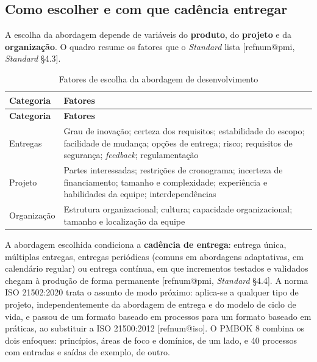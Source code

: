 \documentclass[11pt,a4paper]{article}
\makeatletter
\newcommand{\refnum}[1]{\csname refnum@#1\endcsname}
\newcommand{\cit}[1]{[\refnum{#1}]}
\newcommand{\SingleSpacing}{}
\newcommand{\fontetab}[1]{\par\vspace{3pt}{\small\noindent Fonte: #1\par}}
\makeatother
\begin{document}
\subsection{Como escolher e com que cadência entregar}

A escolha da abordagem depende de variáveis do \textbf{produto}, do \textbf{projeto} e da \textbf{organização}. O quadro resume os fatores que o \textit{Standard} lista [\refnum{pmi}, \textit{Standard} §4.3].

\begingroup\SingleSpacing\small
\begin{longtable}{@{}>{\raggedright\arraybackslash}p{}>{\raggedright\arraybackslash}p{}@{}}
\caption{Fatores de escolha da abordagem de desenvolvimento}\label{tab:t5}\\
\toprule
\textbf{Categoria} & \textbf{Fatores}\\
\midrule
\endfirsthead
\toprule
\textbf{Categoria} & \textbf{Fatores}\\
\midrule
\endhead
\bottomrule
\endfoot
\bottomrule
\endlastfoot
Entregas & Grau de inovação; certeza dos requisitos; estabilidade do escopo; facilidade de mudança; opções de entrega; risco; requisitos de segurança; \textit{feedback}; regulamentação\\[3pt]
Projeto & Partes interessadas; restrições de cronograma; incerteza de financiamento; tamanho e complexidade; experiência e habilidades da equipe; interdependências\\[3pt]
Organização & Estrutura organizacional; cultura; capacidade organizacional; tamanho e localização da equipe\\[3pt]
\end{longtable}
\endgroup
\fontetab{Elaborado pelos autores (2026), com base em \cit{pmi}.}

A abordagem escolhida condiciona a \textbf{cadência de entrega}: entrega única, múltiplas entregas, entregas periódicas (comuns em abordagens adaptativas, em calendário regular) ou entrega contínua, em que incrementos testados e validados chegam à produção de forma permanente [\refnum{pmi}, \textit{Standard} §4.4]. A norma ISO 21502:2020 trata o assunto de modo próximo: aplica-se a qualquer tipo de projeto, independentemente da abordagem de entrega e do modelo de ciclo de vida, e passou de um formato baseado em processos para um formato baseado em práticas, ao substituir a ISO 21500:2012 [\refnum{iso}]. O PMBOK 8 combina os dois enfoques: princípios, áreas de foco e domínios, de um lado, e 40 processos com entradas e saídas de exemplo, de outro.
\end{document}
